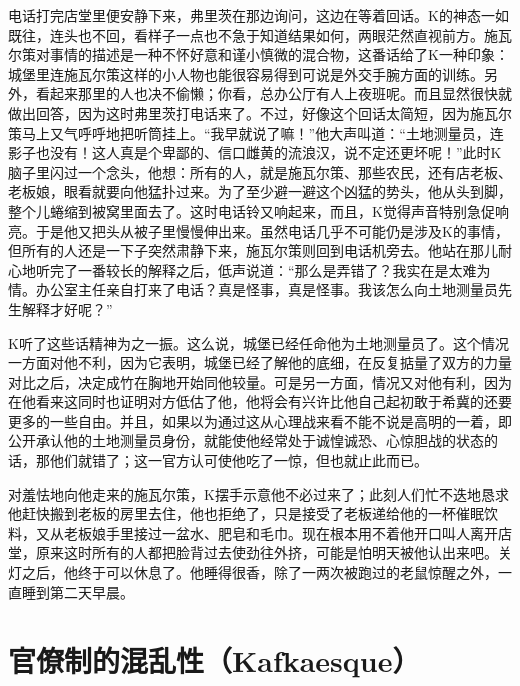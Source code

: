 \documentclass[12pt,a4paper]{article}
\begin{document}
电话打完店堂里便安静下来，弗里茨在那边询问，这边在等着回话。K的神态一如既往，连头也不回，看样子一点也不急于知道结果如何，两眼茫然直视前方。施瓦尔策对事情的描述是一种不怀好意和谨小慎微的混合物，这番话给了K一种印象：城堡里连施瓦尔策这样的小人物也能很容易得到可说是外交手腕方面的训练。另外，看起来那里的人也决不偷懒；你看，总办公厅有人上夜班呢。而且显然很快就做出回答，因为这时弗里茨打电话来了。不过，好像这个回话太简短，因为施瓦尔策马上又气呼呼地把听筒挂上。“我早就说了嘛！”他大声叫道：“土地测量员，连影子也没有！这人真是个卑鄙的、信口雌黄的流浪汉，说不定还更坏呢！”此时K脑子里闪过一个念头，他想：所有的人，就是施瓦尔策、那些农民，还有店老板、老板娘，眼看就要向他猛扑过来。为了至少避一避这个凶猛的势头，他从头到脚，整个儿蜷缩到被窝里面去了。这时电话铃又响起来，而且，K觉得声音特别急促响亮。于是他又把头从被子里慢慢伸出来。虽然电话几乎不可能仍是涉及K的事情，但所有的人还是一下子突然肃静下来，施瓦尔策则回到电话机旁去。他站在那儿耐心地听完了一番较长的解释之后，低声说道：“那么是弄错了？我实在是太难为情。办公室主任亲自打来了电话？真是怪事，真是怪事。我该怎么向土地测量员先生解释才好呢？”

K听了这些话精神为之一振。这么说，城堡已经任命他为土地测量员了。这个情况一方面对他不利，因为它表明，城堡已经了解他的底细，在反复掂量了双方的力量对比之后，决定成竹在胸地开始同他较量。可是另一方面，情况又对他有利，因为在他看来这同时也证明对方低估了他，他将会有兴许比他自己起初敢于希冀的还要更多的一些自由。并且，如果以为通过这从心理战来看不能不说是高明的一着，即公开承认他的土地测量员身份，就能使他经常处于诚惶诚恐、心惊胆战的状态的话，那他们就错了；这一官方认可使他吃了一惊，但也就止此而已。

对羞怯地向他走来的施瓦尔策，K摆手示意他不必过来了；此刻人们忙不迭地恳求他赶快搬到老板的房里去住，他也拒绝了，只是接受了老板递给他的一杯催眠饮料，又从老板娘手里接过一盆水、肥皂和毛巾。现在根本用不着他开口叫人离开店堂，原来这时所有的人都把脸背过去使劲往外挤，可能是怕明天被他认出来吧。关灯之后，他终于可以休息了。他睡得很香，除了一两次被跑过的老鼠惊醒之外，一直睡到第二天早晨。
\par{}
\newpage
\section{官僚制的混乱性（Kafkaesque）}
\vspace{0.5em}
\vspace{0.3em}
\end{document}
